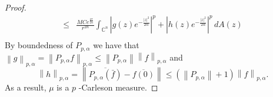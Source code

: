 \documentclass[10pt,a4paper]{amsart}
\begin{document}
\begin{proof}
\begin{align*}
		\leq & \frac{M C e^{\frac{pr}{2\alpha}}}{r^{2n}} \int_{\mathbb{C}^{n}}^{}\left| g(z)e^{-\frac{|z|^2}{2\alpha}} \right| ^{p} + \left| h(z)e^{-\frac{|z|^2}{2\alpha}} \right| ^{p}\, dA(z) \\
	\end{align*}
	By boundedness of $P_{p,\alpha}$ we have that $\left\lVert g \right\rVert _{p,\alpha} = \left\lVert P_{p,\alpha} f \right\rVert _{p,\alpha} \leq \left\lVert P_{p,\alpha} \right\rVert  \left\lVert f \right\rVert _{p,\alpha}$ and
	\[
		\left\lVert h \right\rVert _{p,\alpha} = \left\lVert \overline{P_{p,\alpha}(\bar{f})}-\overline{f(0)} \right\rVert \leq (\left\lVert P_{p,\alpha} \right\rVert +1) \left\lVert f \right\rVert _{p,\alpha}.
	\]
	As a result, $\mu$  is a $p$ -Carleson measure.
\end{proof}
\end{document}
